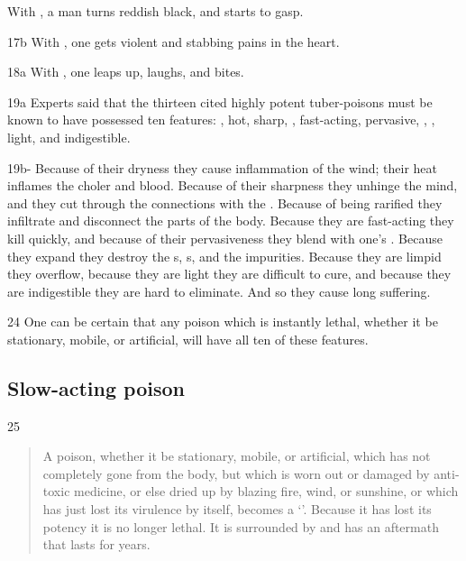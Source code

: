 \begin{translation}
    With
    , a man turns reddish black, and starts to gasp.
    \item[ 17b]
    With
    ,
    one gets violent  and stabbing pains in the heart.
    
    \item[ 18a]
    With
    , one leaps up, laughs, and bites.
    
    
    \item[ 19a]
    Experts said that the thirteen cited highly potent tuber-poisons must be known to have possessed ten features:
   , hot, sharp, ,
    fast-acting, pervasive, , ,
    light, and indigestible.
    
    \item[ 19b-]
    Because of their dryness they cause inflammation of the wind; their heat
    inflames the choler and blood. Because of their sharpness they unhinge the
    mind, and they cut through the connections with the .  Because of being rarified they infiltrate and disconnect
    the parts of the body. Because they are fast-acting they kill quickly, and
    because of their pervasiveness they blend with one's .  Because they expand they destroy the
    s, s, and the
    impurities.  Because they are limpid they overflow,
    because they are light they are difficult to cure, and because they are
    indigestible they are hard to eliminate.  And so they cause long suffering.
    
    \item[ 24]
    One can be certain that any poison which is instantly lethal, whether it be
    stationary, mobile, or artificial, will have all ten of these features.
    
    \subsection{Slow-acting poison}
    \item[25]  
    \begin{verse}
        A poison, whether it be stationary, mobile, or artificial, which has not
        completely gone from the body, but which is worn out or damaged by
        anti-toxic medicine, or else dried up by blazing fire, wind, or sunshine, or
        which has just lost its virulence by itself, becomes a `'\label{dusivisa}.  Because it has lost its potency it is
        no longer lethal.  It is surrounded by  and has an
        aftermath that lasts for years.
        

\end{verse}
\end{translation}
